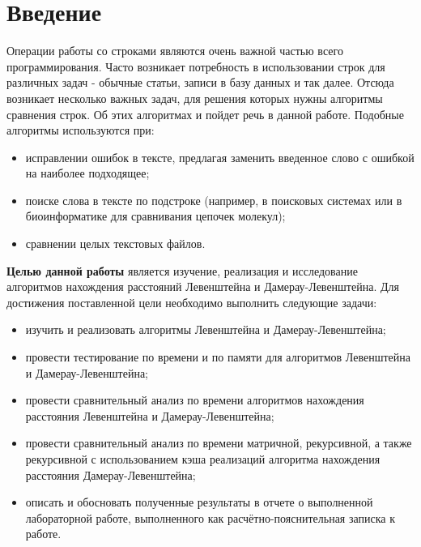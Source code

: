 \chapter*{Введение}

Операции работы со строками являются очень важной частью всего программирования. Часто возникает потребность в использовании строк для различных задач - обычные статьи, записи в базу данных и так далее. Отсюда возникает несколько важных задач, для решения которых нужны алгоритмы сравнения строк. Об этих алгоритмах и пойдет речь в данной работе.
Подобные алгоритмы используются при:
\begin{itemize}
	\item исправлении ошибок в тексте, предлагая заменить введенное слово с ошибкой на наиболее подходящее;
    \item поиске слова в тексте по подстроке (например, в поисковых системах или в биоинформатике для сравнивания цепочек молекул);
    \item сравнении целых текстовых файлов. \newline
\end{itemize}



\textbf{Целью данной работы} является изучение, реализация и исследование алгоритмов нахождения расстояний Левенштейна и Дамерау-Левенштейна.
Для достижения поставленной цели необходимо выполнить следующие задачи:
\begin{itemize}
	\item изучить и реализовать алгоритмы Левенштейна и Дамерау-Левенштейна;
    \item провести тестирование по времени и по памяти для алгоритмов Левенштейна и Дамерау-Левенштейна;
    \item провести сравнительный анализ по времени алгоритмов нахождения расстояния Левенштейна и Дамерау-Левенштейна;
    \item провести сравнительный анализ по времени матричной, рекурсивной, а также рекурсивной с использованием кэша реализаций алгоритма нахождения расстояния Дамерау-Левенштейна;
	\item описать и обосновать полученные результаты в отчете о выполненной лабораторной работе, выполненного как расчётно-пояснительная записка к работе.
\end{itemize}
